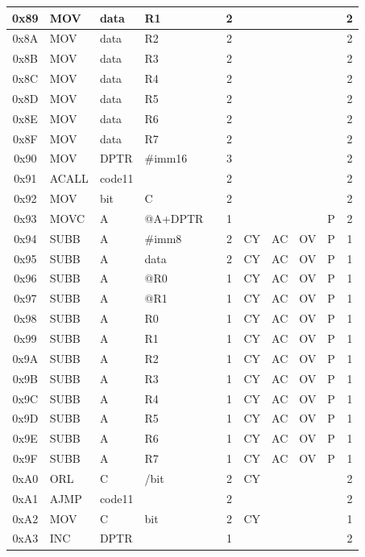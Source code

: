\documentclass[a4paper,twoside,12pt]{book}
\begin{document}
{\begin{longtable}{|c|l|lll|c|llll|c|}
		0x89	& MOV	& data	& R1	&	& 2	&	&	&	&	& 2	\\\hline
		0x8A	& MOV	& data	& R2	&	& 2	&	&	&	&	& 2	\\\hline
		0x8B	& MOV	& data	& R3	&	& 2	&	&	&	&	& 2	\\\hline
		0x8C	& MOV	& data	& R4	&	& 2	&	&	&	&	& 2	\\\hline
		0x8D	& MOV	& data	& R5	&	& 2	&	&	&	&	& 2	\\\hline
		0x8E	& MOV	& data	& R6	&	& 2	&	&	&	&	& 2	\\\hline
		0x8F	& MOV	& data	& R7	&	& 2	&	&	&	&	& 2	\\\hline
		0x90	& MOV	& DPTR	&\#imm16&	& 3	&	&	&	&	& 2	\\\hline
		0x91	& ACALL	& code11&	&	& 2	&	&	&	&	& 2	\\\hline
		0x92	& MOV	& bit	& C	&	& 2	&	&	&	&	& 2	\\\hline
		0x93	& MOVC	& A	&@A+DPTR&	& 1	&	&	&	& P	& 2	\\\hline
		0x94	& SUBB	& A	& \#imm8&	& 2	& CY	& AC	& OV	& P	& 1	\\\hline
		0x95	& SUBB	& A	& data	&	& 2	& CY	& AC	& OV	& P	& 1	\\\hline
		0x96	& SUBB	& A	& @R0	&	& 1	& CY	& AC	& OV	& P	& 1	\\\hline
		0x97	& SUBB	& A	& @R1	&	& 1	& CY	& AC	& OV	& P	& 1	\\\hline
		0x98	& SUBB	& A	& R0	&	& 1	& CY	& AC	& OV	& P	& 1	\\\hline
		0x99	& SUBB	& A	& R1	&	& 1	& CY	& AC	& OV	& P	& 1	\\\hline
		0x9A	& SUBB	& A	& R2	&	& 1	& CY	& AC	& OV	& P	& 1	\\\hline
		0x9B	& SUBB	& A	& R3	&	& 1	& CY	& AC	& OV	& P	& 1	\\\hline
		0x9C	& SUBB	& A	& R4	&	& 1	& CY	& AC	& OV	& P	& 1	\\\hline
		0x9D	& SUBB	& A	& R5	&	& 1	& CY	& AC	& OV	& P	& 1	\\\hline
		0x9E	& SUBB	& A	& R6	&	& 1	& CY	& AC	& OV	& P	& 1	\\\hline
		0x9F	& SUBB	& A	& R7	&	& 1	& CY	& AC	& OV	& P	& 1	\\\hline
		0xA0	& ORL	& C	& /bit	&	& 2	& CY	&	&	&	& 2	\\\hline
		0xA1	& AJMP	& code11&	&	& 2	&	&	&	&	& 2	\\\hline
		0xA2	& MOV	& C	& bit	&	& 2	& CY	&	&	&	& 1	\\\hline
		0xA3	& INC	& DPTR	&	&	& 1	&	&	&	&	& 2	\\\hline

\end{longtable}}
\end{document}
